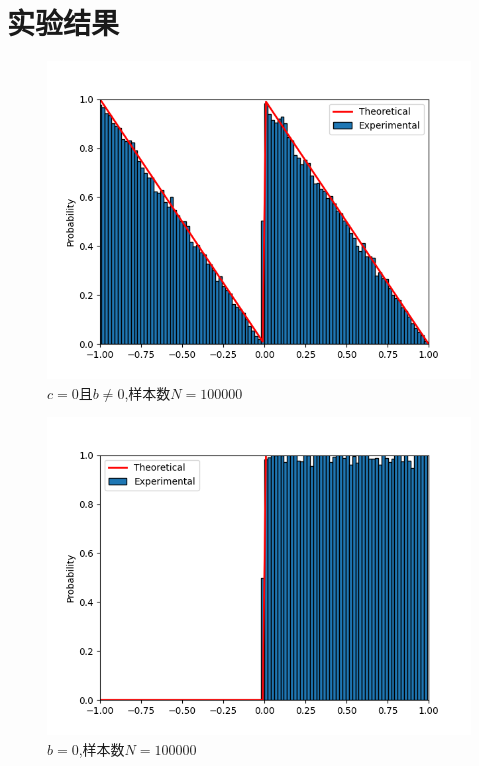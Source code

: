 \documentclass[UTF8]{ctexart}
\begin{document}
\section{实验结果}
\begin{figure}[H]
    \centering
    \includegraphics[scale=0.5]{1.png}
    \caption{$c=0$且$b\neq 0$,样本数$N=100000$}
\end{figure}
\begin{figure}[H]
    \centering
    \includegraphics[scale=0.5]{2.png}
    \caption{$b=0$,样本数$N=100000$}
\end{figure}
\end{document}
